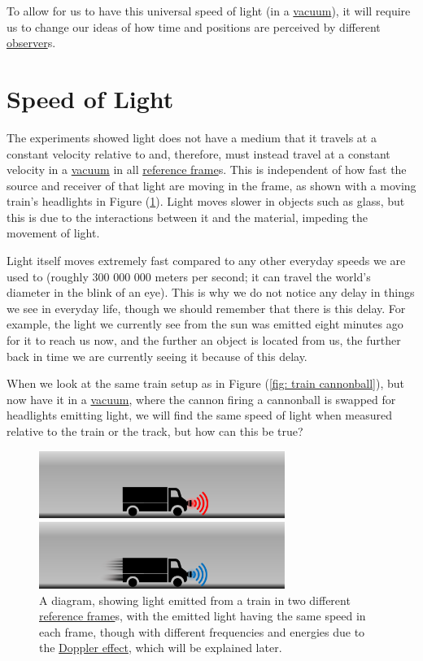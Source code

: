 To allow for us to have this universal speed of light (in a \hyperlink{def-vacuum}{vacuum}), it will require us to change our ideas of how time and positions are perceived by different \hyperlink{def-observer}{observer}s.

\section{Speed of Light}%

The experiments showed light does not have a medium that it travels at a constant velocity relative to and, therefore, must instead travel at a constant velocity in a \hyperlink{def-vacuum}{vacuum} in all \hyperlink{def-Reference-frame}{reference frame}s.
This is independent of how fast the source and receiver of that light are moving in the frame, as shown with a moving train's headlights in Figure (\ref{fig: train torch}).
Light moves slower in objects such as glass, but this is due to the interactions between it and the material, impeding the movement of light.

Light itself moves extremely fast compared to any other everyday speeds we are used to (roughly 300 000 000 meters per second; it can travel the world's diameter in the blink of an eye).
This is why we do not notice any delay in things we see in everyday life, though we should remember that there is this delay.
For example, the light we currently see from the sun was emitted eight minutes ago for it to reach us now, and the further an object is located from us, the further back in time we are currently seeing it because of this delay.

When we look at the same train setup as in Figure (\ref{fig: train cannonball}), but now have it in a \hyperlink{def-vacuum}{vacuum}, where the cannon firing a cannonball is swapped for headlights emitting light, we will find the same speed of light when measured relative to the train or the track, but how can this be true?

\begin{figure}[H]
	\centering
	\includegraphics[width=8cm]{images/pdf/lorry_torch.pdf}
	\caption{A diagram, showing light emitted from a train in two different \protect\hyperlink{def-Reference-frame}{reference frame}s, with the emitted light having the same speed in each frame, though with different frequencies and energies due to the \protect\hyperlink{def-doppler-effect}{Doppler effect}, which will be explained later.}
	\label{fig: train torch}
\end{figure}

